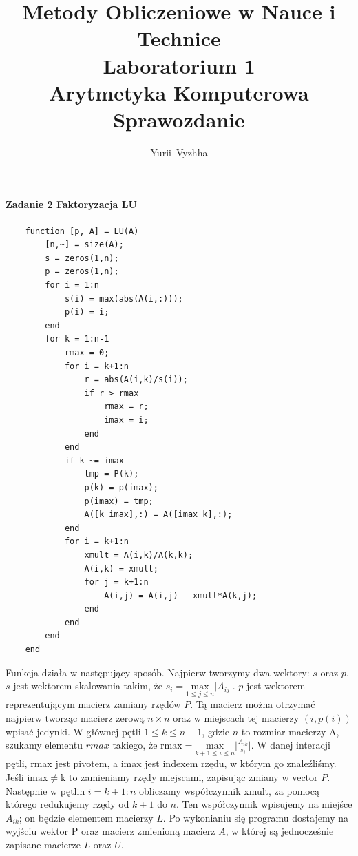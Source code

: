 \documentclass[12pt,a4paper]{article}
\author{Yurii~Vyzhha}
\title{Metody Obliczeniowe w Nauce i Technice \\ Laboratorium 1 \\
  Arytmetyka Komputerowa \\ Sprawozdanie}
\begin{document}
  \maketitle
  \paragraph{Zadanie 2 Faktoryzacja LU}%
  \begin{Verbatim}
    function [p, A] = LU(A)
        [n,~] = size(A);
        s = zeros(1,n);
        p = zeros(1,n);
        for i = 1:n
            s(i) = max(abs(A(i,:)));
            p(i) = i;
        end
        for k = 1:n-1
            rmax = 0;
            for i = k+1:n
                r = abs(A(i,k)/s(i));
                if r > rmax
                    rmax = r;
                    imax = i;
                end
            end
            if k ~= imax
                tmp = P(k);
                p(k) = p(imax);
                p(imax) = tmp;
                A([k imax],:) = A([imax k],:);
            end
            for i = k+1:n
                xmult = A(i,k)/A(k,k);
                A(i,k) = xmult;
                for j = k+1:n
                    A(i,j) = A(i,j) - xmult*A(k,j);
                end
            end
        end
    end
  \end{Verbatim}
  Funkcja działa w następujący sposób. Najpierw tworzymy dwa wektory: $s$ oraz $p$.
  $s$ jest wektorem skalowania takim, że
  $s_i = \underset{1 \leq j \leq n}{\mathrm{max}}\lvert A_{ij} \rvert$.
  $p$ jest wektorem reprezentującym macierz zamiany rzędów $P$. Tą macierz można otrzymać
  najpierw tworząc macierz zerową $n \times n$ oraz w miejscach tej macierzy $(i,p(i))$
  wpisać jedynki. W głównej pętli $1 \leq k \leq n-1$, gdzie $n$ to rozmiar macierzy A,
  szukamy elementu $rmax$ takiego, że
  $\mathrm{rmax} = \underset{k+1 \leq i \leq n}{\mathrm{max}} \lvert \frac{A_{ik}}{s_i} \rvert$.
  W danej interacji pętli, rmax jest pivotem, a imax jest indexem rzędu, w
  którym go znaleźliśmy. Jeśli $\mathrm{imax} \neq \mathrm{k}$ to zamieniamy
  rzędy miejscami, zapisując zmiany w vector $P$. Następnie w pętlin $i = k+1:n$ obliczamy
  współczynnik xmult, za pomocą którego redukujemy rzędy od $k+1$ do $n$. Ten współczynnik
  wpisujemy na miejśce $A_{ik}$; on będzie elementem macierzy $L$. Po wykonianiu się
  programu dostajemy na wyjściu wektor P oraz macierz zmienioną macierz $A$, w
  której są jednocześnie zapisane macierze $L$ oraz $U$. \newline
\end{document}
